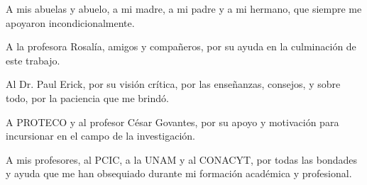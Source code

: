 \begin{agradecimiento}
\begin{flushright}

A mis abuelas y abuelo, a mi madre, a mi padre y a mi hermano, que siempre me apoyaron incondicionalmente.
\newline

A la profesora Rosalía, amigos y compañeros, por su ayuda en la culminación de este trabajo.
\newline

Al Dr. Paul Erick, por su visión crítica, por las enseñanzas, consejos, y sobre todo, por la paciencia que me brindó.
\newline

A PROTECO y al profesor César Govantes, por su apoyo y motivación para incursionar en el campo de la investigación. 
\newline

A mis profesores, al PCIC, a la UNAM y al CONACYT, por todas las bondades y ayuda que me han obsequiado durante mi formación académica y profesional.
\newline

  \end{flushright}
\end{agradecimiento}